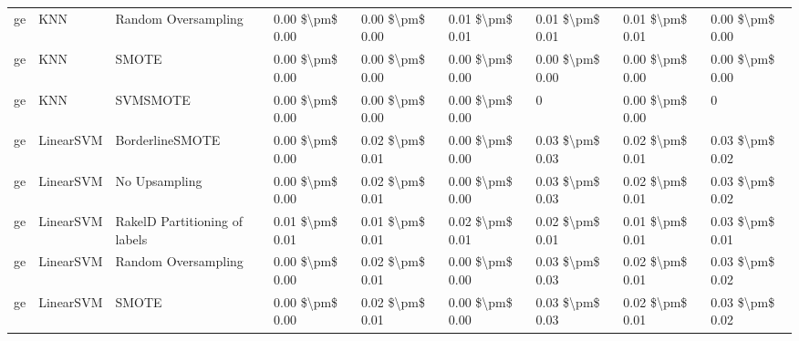 \begin{tabular}{lllllllll}
      ge &                             KNN &           Random Oversampling & 0.00 \$\textbackslash pm\$ 0.00 &           0.00 \$\textbackslash pm\$ 0.00 &       0.01 \$\textbackslash pm\$ 0.01 &        0.01 \$\textbackslash pm\$ 0.01 &                         0.01 \$\textbackslash pm\$ 0.01 &     0.00 \$\textbackslash pm\$ 0.00 \\
      ge &                             KNN &                         SMOTE & 0.00 \$\textbackslash pm\$ 0.00 &           0.00 \$\textbackslash pm\$ 0.00 &       0.00 \$\textbackslash pm\$ 0.00 &        0.00 \$\textbackslash pm\$ 0.00 &                         0.00 \$\textbackslash pm\$ 0.00 &     0.00 \$\textbackslash pm\$ 0.00 \\
      ge &                             KNN &                      SVMSMOTE & 0.00 \$\textbackslash pm\$ 0.00 &           0.00 \$\textbackslash pm\$ 0.00 &       0.00 \$\textbackslash pm\$ 0.00 &                      0 &                         0.00 \$\textbackslash pm\$ 0.00 &                   0 \\
      ge &                       LinearSVM &               BorderlineSMOTE & 0.00 \$\textbackslash pm\$ 0.00 &           0.02 \$\textbackslash pm\$ 0.01 &       0.00 \$\textbackslash pm\$ 0.00 &        0.03 \$\textbackslash pm\$ 0.03 &                         0.02 \$\textbackslash pm\$ 0.01 &     0.03 \$\textbackslash pm\$ 0.02 \\
      ge &                       LinearSVM &                 No Upsampling & 0.00 \$\textbackslash pm\$ 0.00 &           0.02 \$\textbackslash pm\$ 0.01 &       0.00 \$\textbackslash pm\$ 0.00 &        0.03 \$\textbackslash pm\$ 0.03 &                         0.02 \$\textbackslash pm\$ 0.01 &     0.03 \$\textbackslash pm\$ 0.02 \\
      ge &                       LinearSVM & RakelD Partitioning of labels & 0.01 \$\textbackslash pm\$ 0.01 &           0.01 \$\textbackslash pm\$ 0.01 &       0.02 \$\textbackslash pm\$ 0.01 &        0.02 \$\textbackslash pm\$ 0.01 &                         0.01 \$\textbackslash pm\$ 0.01 &     0.03 \$\textbackslash pm\$ 0.01 \\
      ge &                       LinearSVM &           Random Oversampling & 0.00 \$\textbackslash pm\$ 0.00 &           0.02 \$\textbackslash pm\$ 0.01 &       0.00 \$\textbackslash pm\$ 0.00 &        0.03 \$\textbackslash pm\$ 0.03 &                         0.02 \$\textbackslash pm\$ 0.01 &     0.03 \$\textbackslash pm\$ 0.02 \\
      ge &                       LinearSVM &                         SMOTE & 0.00 \$\textbackslash pm\$ 0.00 &           0.02 \$\textbackslash pm\$ 0.01 &       0.00 \$\textbackslash pm\$ 0.00 &        0.03 \$\textbackslash pm\$ 0.03 &                         0.02 \$\textbackslash pm\$ 0.01 &     0.03 \$\textbackslash pm\$ 0.02 \\

\end{tabular}

